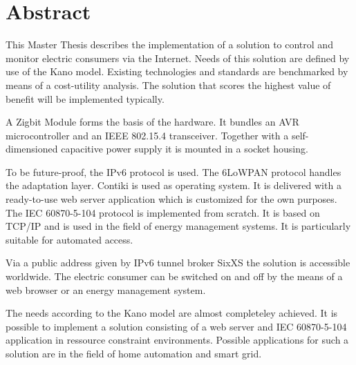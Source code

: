 

\section*{Abstract}

This Master Thesis describes the implementation of a solution to control and monitor electric consumers via the Internet. Needs of this solution are defined by use of the Kano model. Existing technologies and standards are benchmarked by means of a cost-utility analysis. The solution that scores the highest value of benefit will be implemented typically.

A Zigbit Module forms the basis of the hardware. It bundles an AVR microcontroller and an IEEE 802.15.4 transceiver. Together with a self-dimensioned capacitive power supply it is mounted in a socket housing.

To be future-proof, the IPv6 protocol is used. The 6LoWPAN protocol handles the adaptation layer. Contiki is used as operating system. It is delivered with a ready-to-use web server application which is customized for the own purposes. The IEC 60870-5-104 protocol is implemented from scratch. It is based on TCP/IP and is used in the field of energy management systems. It is particularly suitable for automated access.

Via a public address given by IPv6 tunnel broker SixXS the solution is accessible worldwide. The electric consumer can be switched on and off by the means of a web browser or an energy management system.

The needs according to the Kano model are almost completeley achieved. It is possible to implement a solution consisting of a web server and IEC 60870-5-104 application in ressource constraint environments. Possible applications for such a solution are in the field of home automation and smart grid.


